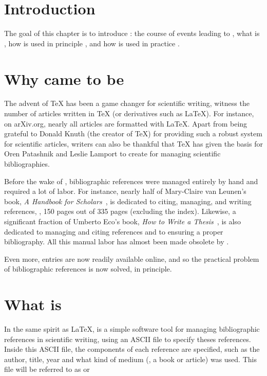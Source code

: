 \section{Introduction}
The goal of this chapter is to introduce {\bibtex}: the course of
events leading to {\bibtex} , what
{\bibtex} is , how {\bibtex} is used
in principle , and how {\bibtex} is
used in practice .


\section{Why {\bibtex} came to be}
\label{sec:why_bibtex_came_to_be}

The advent of {\TeX} has been a game changer for scientific writing,
witness the number of articles written in {\TeX} (or derivatives such
as {\LaTeX}).  For instance, on arXiv.org, nearly all articles are
formatted with \LaTeX.  Apart from being grateful to Donald Knuth (the
creator of \TeX) for providing such a robust system for scientific
articles, writers can also be thankful that {\TeX} has given the basis
for Oren Patashnik and Leslie Lamport to create {\bibtex} for managing
scientific bibliographies.

Before the wake of {\bibtex}, bibliographic references were managed
entirely by hand and required a lot of labor.  For instance, nearly
half of Mary-Claire van Leunen's book, \textit{A Handbook for
  Scholars}~\cite{leunen1992_handbook}, is dedicated to citing,
managing, and writing references, \ie, 150 pages out of 335 pages
(excluding the index).  Likewise, a significant fraction of Umberto
Eco's book, \textit{How to Write a Thesis}~\cite{eco1985_thesis}, is
also dedicated to managing and citing references and to ensuring a
proper bibliography.  All this manual labor has almost been made
obsolete by {\bibtex}.

Even more, {\bibtex} entries are now readily available online, and so
the practical problem of bibliographic references is now solved, in
principle.

\section{What is {\bibtex}}
\label{sec:principles_of_bibtex}

In the same spirit as {\LaTeX}, {\bibtex} is a simple software tool
for managing bibliographic references in scientific writing, using an
ASCII file to specify theses references.  Inside this ASCII file, the
components of each reference are specified, such as the author, title,
year and what kind of medium (\eg, a book or article) was used.  This
file will be referred to as  or

